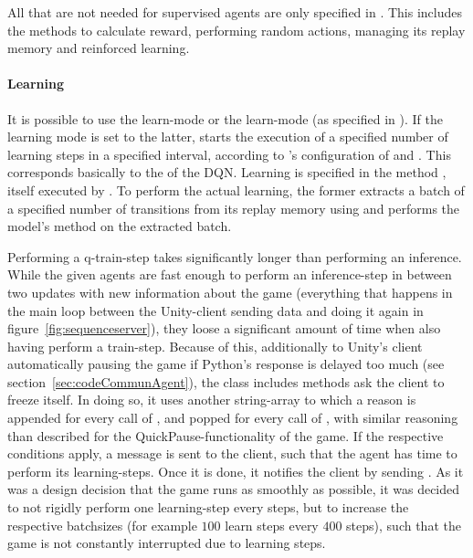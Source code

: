 All  that are not needed for supervised agents are only specified in . This includes the methods to calculate reward, performing random actions, managing its replay memory and reinforced learning.


\paragraph{Learning}

It is possible to use the  learn-mode or the  learn-mode (as specified in ). If the learning mode is set to the latter,  starts the execution of a specified number of learning steps in a specified interval, according to 's configuration of  and . This corresponds basically to the  of the DQN\cite{mnih_human-level_2015}. Learning is specified in the method , itself executed by . To perform the actual learning, the former extracts a batch of a specified number of transitions from its replay memory using  and performs the model's method  on the extracted batch. 

Performing a q-train-step takes significantly longer than performing an inference. While the given agents are fast enough to perform an inference-step in between two updates with new information about the game (everything that happens in the main loop between the Unity-client sending data and doing it again in figure~\ref{fig:sequenceserver}), they loose a significant amount of time when also having perform a train-step. Because of this, additionally to Unity's client automatically pausing the game if Python's response is delayed too much (see section~\ref{sec:codeCommunAgent}), the class  includes methods ask the client to freeze itself. In doing so, it uses another string-array  to which a reason is appended for every call of , and popped for every call of , with similar reasoning than described for the QuickPause-functionality of the game. If the respective conditions apply, a message  is sent to the client, such that the agent has time to perform its learning-steps. Once it is done, it notifies the client by sending . As it was a design decision that the game runs as smoothly as possible, it was decided to not rigidly perform one learning-step every 
 steps, but to increase the respective batchsizes (for example $100$ learn steps every $400$ steps), such that the game is not constantly interrupted due to learning steps. 

